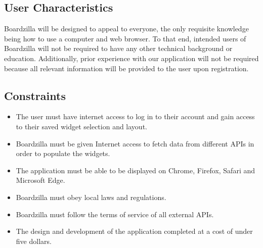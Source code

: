\documentclass[]{article}
\begin{document}
\subsection{User Characteristics}
\label{sub:user_characteristics}
Boardzilla will be designed to appeal to everyone, the only requisite knowledge being how to use a computer and web browser. To that end, intended users of Boardzilla will not be required to have any other technical background or education. Additionally, prior experience with our application will not be required because all relevant information will be provided to the user upon registration. 

\subsection{Constraints}
\label{sub:constraints}
\begin{itemize}
    \item The user must have internet access to log in to their account and gain access to their saved widget selection and layout.
    \item Boardzilla must be given Internet access to fetch data from different APIs in order to populate the widgets.
    \item The application must be able to be displayed on Chrome, Firefox, Safari and Microsoft Edge.
    \item Boardzilla must obey local laws and regulations.
    \item Boardzilla must follow the terms of service of all external APIs.
    \item The design and development of the application completed at a cost of under five dollars.
\end{itemize}
\end{document}
